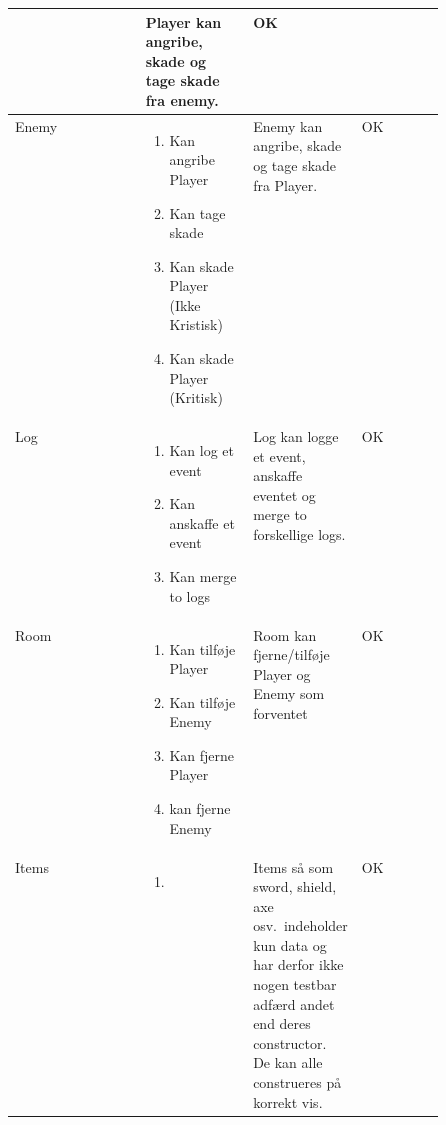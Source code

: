 \begin{center}
\begin{longtable}{|l|p{0.25\linewidth}|p{0.25\linewidth}|l|}
\begin{enumerate}
  \end{enumerate}
  &
  \flushleft
  Player kan angribe, skade og tage skade fra enemy.
  &
  OK
  \\ \hline
  Enemy
  &
  \begin{enumerate}
    \item \begin{flushleft} Kan angribe Player  \end{flushleft}
    \item \begin{flushleft} Kan tage skade \end{flushleft}
    \item \begin{flushleft} Kan skade Player (Ikke Kristisk)  \end{flushleft}
    \item \begin{flushleft} Kan skade Player (Kritisk)  \end{flushleft}
  \end{enumerate}
  &
  \flushleft
  Enemy kan angribe, skade og tage skade fra Player.
  &
  OK
  \\ \hline
  Log
  &
  \begin{enumerate}
    \item \begin{flushleft} Kan log et event \end{flushleft}
    \item \begin{flushleft} Kan anskaffe et event \end{flushleft}
    \item \begin{flushleft} Kan merge to logs \end{flushleft}
  \end{enumerate}
  &
  \flushleft
  Log kan logge et event, anskaffe eventet og merge to forskellige logs.
  &
  OK
  \\ \hline
  Room                          
  & 
  \begin{enumerate}
    \item Kan tilføje Player
    \item Kan tilføje Enemy
    \item Kan fjerne Player
    \item kan fjerne Enemy
  \end{enumerate}
  &
  \flushleft
  Room kan fjerne/tilføje Player og Enemy som forventet
  &
  OK
  \\ \hline
  Items
  &
  \begin{enumerate}
    \item[]
  \end{enumerate}
  &
  \flushleft
  Items så som sword, shield, axe osv.\ indeholder kun data og har derfor ikke nogen
  testbar adfærd andet end deres constructor. De kan alle construeres på korrekt vis.
  &
  OK
  \\ \hline
\end{longtable}
\addtocounter{table}{-1}
\end{center}

